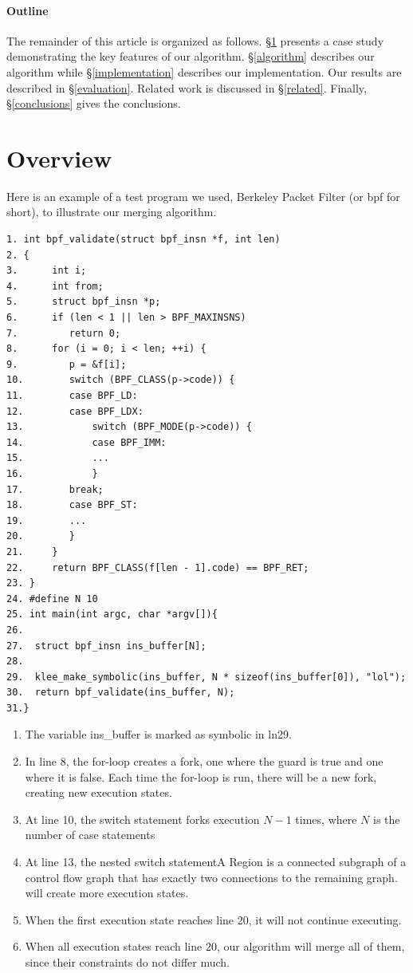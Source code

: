 \documentclass[12pt,a4paper]{article}
\begin{document}
\paragraph{Outline}

The remainder of this article is organized as follows. \S\ref{overview} presents a case study demonstrating the key features of our algorithm. \S\ref{algorithm} describes our algorithm while \S\ref{implementation} describes our implementation. Our results are described in \S\ref{evaluation}. Related work is discussed in \S\ref{related}. Finally, \S\ref{conclusions} gives the conclusions.

\section{Overview}\label{overview}
Here is an example of a test program we used, Berkeley Packet Filter (or bpf for short), to illustrate our merging algorithm.

\begin{verbatim}
1. int bpf_validate(struct bpf_insn *f, int len)
2. {
3.      int i;
4.      int from;
5.      struct bpf_insn *p;
6.      if (len < 1 || len > BPF_MAXINSNS)
7.         return 0;
8.      for (i = 0; i < len; ++i) {
9.         p = &f[i];
10.        switch (BPF_CLASS(p->code)) {
11.        case BPF_LD:
12.        case BPF_LDX:
13.            switch (BPF_MODE(p->code)) {
14.            case BPF_IMM:
15.            ...
16.            }
17.        break;
18.        case BPF_ST:
19.        ...
20.        }
21.     }
22.     return BPF_CLASS(f[len - 1].code) == BPF_RET;
23. }
24. #define N 10 
25. int main(int argc, char *argv[]){  
26.
27.  struct bpf_insn ins_buffer[N];
28.
29.  klee_make_symbolic(ins_buffer, N * sizeof(ins_buffer[0]), "lol");
30.  return bpf_validate(ins_buffer, N);
31.}
\end{verbatim}

\begin{enumerate}
\item The variable ins\_buffer is marked as symbolic in ln29. 
\item In line 8, the for-loop creates a fork, one where the guard is true and one where it is false. Each time the for-loop is run, there will be a new fork, creating new execution states. 
\item At line 10, the switch statement forks execution $N-1$ times, where $N$ is the number of case statements
\item At line 13, the nested switch statementA Region is a connected subgraph of a control flow graph that has exactly two connections to the remaining graph. will create more execution states. 
\item When the first execution state reaches line 20, it will not continue executing.
\item When all execution states reach line 20, our algorithm will merge all of them, since their constraints do not differ much.
\end{enumerate}
\end{document}
